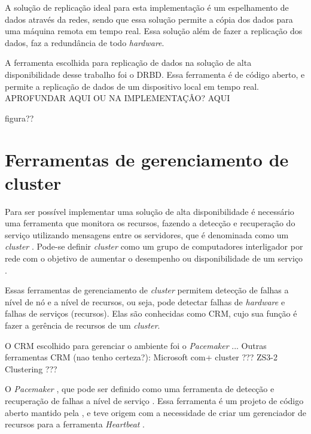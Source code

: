 A solução de replicação ideal para esta implementação é um espelhamento de dados através da redes, sendo que essa solução permite a cópia dos 
dados para uma máquina remota em tempo real. Essa solução além de fazer a replicação dos dados, faz a redundância de todo \textit{hardware}.

A ferramenta escolhida para replicação de dados na solução de alta disponibilidade desse trabalho foi o \ac{DRBD}. Essa ferramenta é de código
aberto, e permite a replicação de dados de um dispositivo local em tempo real. 
APROFUNDAR AQUI OU NA IMPLEMENTAÇÂO? AQUI

figura??


\section{Ferramentas de gerenciamento de cluster}
\label{section:toolcluster}

Para ser possível implementar uma solução de alta disponibilidade é necessário uma ferramenta que monitora os recursos, fazendo a detecção e
recuperação do serviço utilizando mensagens entre os servidores, que é denominada como um \textit{cluster} \cite{perkov2011}. 
Pode-se definir \textit{cluster} como um grupo de computadores interligador por rede com o objetivo de aumentar o desempenho ou disponibilidade
de um serviço \cite{freitas2005}.

Essas ferramentas de gerenciamento de \textit{cluster} permitem detecção de falhas a nível de nó e a nível de recursos, ou seja, pode detectar
falhas de \textit{hardware} e falhas de serviços (recursos).
Elas são conhecidas como \ac{CRM}, cujo sua função é fazer a gerência de recursos de um \textit{cluster}.

O \ac{CRM} escolhido para gerenciar o ambiente foi o \textit{Pacemaker} ...
Outras ferramentas CRM (nao tenho certeza?):
Microsoft com+ cluster ???
ZS3-2 Clustering ???

O \textit{Pacemaker} \cite{pacemaker}, que pode ser definido como uma ferramenta de detecção e recuperação de falhas a nível de 
serviço \cite{perkov2011}. Essa ferramenta é um projeto de código aberto mantido pela \cite{clusterlabs}, 
e teve origem com a necessidade de criar um gerenciador de recursos para a ferramenta \textit{Heartbeat} \cite{heartbeat}. 

